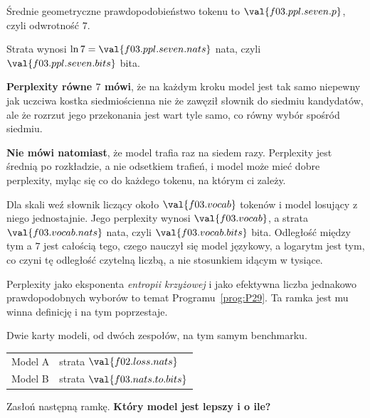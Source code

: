 \begin{fr}
\begin{ansblock}
Średnie geometryczne prawdopodobieństwo tokenu to $\val{f03.ppl.seven.p}$,
czyli odwrotność $7$.

Strata wynosi $\ln 7 = \val{f03.ppl.seven.nats}$ nata, czyli
$\val{f03.ppl.seven.bits}$ bita.
\end{ansblock}

\textbf{Perplexity równe $7$ mówi}, że na każdym kroku model jest tak samo
niepewny jak uczciwa kostka siedmiościenna \dash{} nie że zawęził słownik do
siedmiu kandydatów, ale że rozrzut jego przekonania jest wart tyle samo, co
równy wybór spośród siedmiu.

\textbf{Nie mówi natomiast}, że model trafia raz na siedem razy. Perplexity
jest średnią po rozkładzie, a nie odsetkiem trafień, i model może mieć dobre
perplexity, myląc się co do każdego tokenu, na którym ci zależy.

Dla skali weź słownik liczący około $\val{f03.vocab}$ tokenów i model losujący
z niego jednostajnie. Jego perplexity wynosi $\val{f03.vocab}$, a strata
$\val{f03.vocab.nats}$ nata, czyli $\val{f03.vocab.bits}$ bita. Odległość
między tym a $7$ jest całością tego, czego nauczył się model językowy, a
logarytm jest tym, co czyni tę odległość czytelną liczbą, a nie stosunkiem
idącym w tysiące.

Perplexity jako eksponenta \emph{entropii krzyżowej} i jako efektywna liczba
jednakowo prawdopodobnych wyborów to temat Programu~\ref{prog:P29}. Ta ramka
jest mu winna definicję i na tym poprzestaje.
\end{fr}

\begin{fr}
Dwie karty modeli, od dwóch zespołów, na tym samym benchmarku.

\begin{center}
\begin{tabular}{ll}
\toprule
Model A & strata $\val{f02.loss.nats}$ \\
Model B & strata $\val{f03.nats.to.bits}$ \\
\bottomrule
\end{tabular}
\end{center}

Zasłoń następną ramkę. \textbf{Który model jest lepszy i o ile?}
\dotline
\nextframe
\end{fr}

